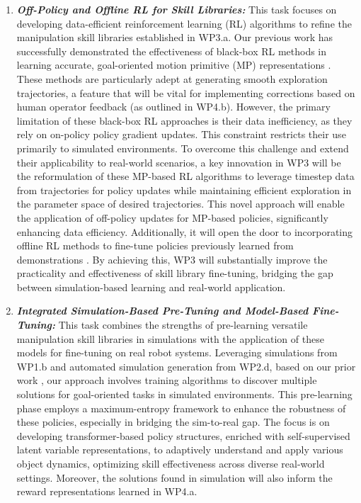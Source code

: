 \documentclass{erc-B2}
\begin{document}
\begin{enumerate}
\item \textit{\textbf{ Off-Policy and Offline RL for Skill Libraries:}}  This task focuses on developing data-efficient reinforcement learning (RL) algorithms to refine the manipulation skill libraries established in WP3.a. Our previous work has successfully demonstrated the effectiveness of black-box RL methods in learning accurate, goal-oriented motion primitive (MP) representations \cite{otto2023deep, otto2023mp3}. These methods are particularly adept at generating smooth exploration trajectories, a feature that will be vital for implementing corrections based on human operator feedback (as outlined in WP4.b).
However, the primary limitation of these black-box RL approaches is their data inefficiency, as they rely on on-policy policy gradient updates. This constraint restricts their use primarily to simulated environments. To overcome this challenge and extend their applicability to real-world scenarios, a key innovation in WP3 will be the reformulation of these MP-based RL algorithms to leverage timestep data from trajectories for policy updates while maintaining efficient exploration in the parameter space of desired trajectories.
This novel approach will enable the application of off-policy updates \cite{lillicrap2015continuous, haarnoja2018soft,fujimoto2018addressing} for MP-based policies, significantly enhancing data efficiency. Additionally, it will open the door to incorporating offline RL methods to fine-tune policies previously learned from demonstrations \cite{blessing2023information,David2024}. By achieving this, WP3 will substantially improve the practicality and effectiveness of skill library fine-tuning, bridging the gap between simulation-based learning and real-world application.

\item \textit{\textbf{Integrated Simulation-Based Pre-Tuning and Model-Based Fine-Tuning:}} This task combines the strengths of pre-learning versatile manipulation skill libraries in simulations with the application of these models for fine-tuning on real robot systems. Leveraging simulations from WP1.b and automated simulation generation from WP2.d, based on our prior work \cite{celik2022specializing}, our approach involves training algorithms to discover multiple solutions for goal-oriented tasks in simulated environments. This pre-learning phase employs a maximum-entropy framework to enhance the robustness of these policies, especially in bridging the sim-to-real gap. The focus is on developing transformer-based policy structures, enriched with self-supervised latent variable representations, to adaptively understand and apply various object dynamics, optimizing skill effectiveness across diverse real-world settings. Moreover, the solutions found in simulation will also inform the reward representations learned in WP4.a. 


\end{enumerate}
\end{document}
